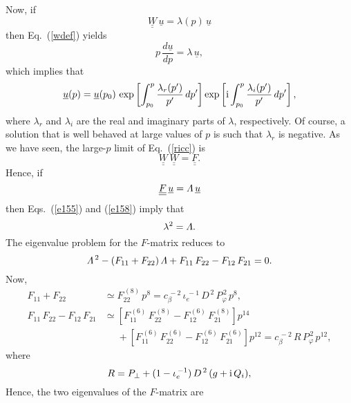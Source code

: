 \documentclass[12pt,prb,aps,notitlepage]{revtex4-1}
\begin{document}
Now, if
\begin{equation}\label{e155}
\underline{\underline{W}}\,\underline{u}= \lambda(p)\,\underline{u}
\end{equation}
then Eq.~(\ref{wdef}) yields
\begin{equation}
p\,\frac{d\underline{u}}{dp} = \lambda\,\underline{u},
\end{equation}
which implies that
\begin{equation}
\underline{u}(p) = \underline{u}(p_0)\,\exp\left[\int_{p_0}^p\frac{\lambda_r(p')}{p'}\,dp'\right]\exp\left[{\rm i}\int_{p_0}^p\frac{\lambda_i(p')}{p'}\,dp'\right], 
\end{equation}
where $\lambda_r$  and $\lambda_i$ are the real and imaginary parts of $\lambda$, respectively. 
Of course, a solution that is well behaved at large values of $p$ is such that $\lambda_r$ is negative. As we have seen, the large-$p$ limit of
Eq.~(\ref{ricc}) is
\begin{equation}
\underline{\underline{W}}\,\underline{\underline{W}} = \underline{\underline{F}}.
\end{equation}
Hence, if
\begin{equation}\label{e158}
 \underline{\underline{F}}\,\underline{u} = {\mit\Lambda}\,\underline{u}
 \end{equation}
 then Eqs.~(\ref{e155}) and (\ref{e158}) imply that 
 \begin{equation}
 \lambda^2 = {\mit\Lambda}.
 \end{equation}
 The eigenvalue problem for the $F$-matrix reduces to
 \begin{equation}
 {\mit\Lambda}^{\,2}- (F_{11}+ F_{22})\,{\mit\Lambda} + F_{11}\,F_{22} - F_{12}\,F_{21}=0.
 \end{equation}
 Now,
 \begin{align}
 F_{11}+F_{22}&\simeq  F_{22}^{\,(8)}\,p^8 =c_\beta^{\,-2}\, \iota_e^{\,-1}\,D^{\,2}\,P_\varphi^{\,2}\,p^8,\\[0.5ex]
 F_{11}\,F_{22} - F_{12}\,F_{21}&  \simeq \left[F_{11}^{\,(6)}\,F_{22}^{\,(8)} - F_{12}^{\,(6)}\,F_{21}^{\,(8)}\right]p^{14}\nonumber\\[0.5ex]&\phantom{=}+\left[F_{11}^{\,(6)}\,F_{22}^{\,(6)} - F_{12}^{\,(6)}\,F_{21}^{\,(6)}\right]p^{12}
=c_\beta^{\,-2}\,R\,P_\varphi^{\,2}\,p^{12},
 \end{align}
  where 
 \begin{equation}
 R= P_\perp + (1-\iota_e^{\,-1})\,D^{\,2}\,(g+{\rm i}\,Q_i),
 \end{equation}
Hence, the two eigenvalues of the $F$-matrix are
\end{document}
